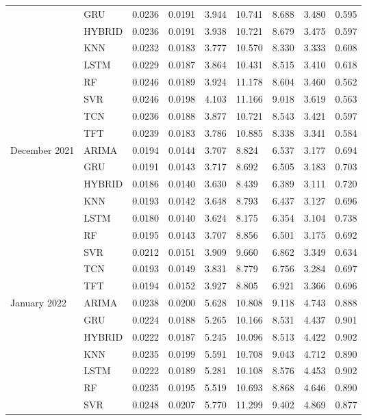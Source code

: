 \begin{tabular}{lllllllll}
 & GRU & 0.0236 & 0.0191 & 3.944 & 10.741 & 8.688 & 3.480 & 0.595 \\
 & HYBRID & 0.0236 & 0.0191 & 3.938 & 10.721 & 8.679 & 3.475 & 0.597 \\
 & KNN & 0.0232 & 0.0183 & 3.777 & 10.570 & 8.330 & 3.333 & 0.608 \\
 & LSTM & 0.0229 & 0.0187 & 3.864 & 10.431 & 8.515 & 3.410 & 0.618 \\
 & RF & 0.0246 & 0.0189 & 3.924 & 11.178 & 8.604 & 3.460 & 0.562 \\
 & SVR & 0.0246 & 0.0198 & 4.103 & 11.166 & 9.018 & 3.619 & 0.563 \\
 & TCN & 0.0236 & 0.0188 & 3.877 & 10.721 & 8.543 & 3.421 & 0.597 \\
 & TFT & 0.0239 & 0.0183 & 3.786 & 10.885 & 8.338 & 3.341 & 0.584 \\
December 2021 & ARIMA & 0.0194 & 0.0144 & 3.707 & 8.824 & 6.537 & 3.177 & 0.694 \\
 & GRU & 0.0191 & 0.0143 & 3.717 & 8.692 & 6.505 & 3.183 & 0.703 \\
 & HYBRID & 0.0186 & 0.0140 & 3.630 & 8.439 & 6.389 & 3.111 & 0.720 \\
 & KNN & 0.0193 & 0.0142 & 3.648 & 8.793 & 6.437 & 3.127 & 0.696 \\
 & LSTM & 0.0180 & 0.0140 & 3.624 & 8.175 & 6.354 & 3.104 & 0.738 \\
 & RF & 0.0195 & 0.0143 & 3.707 & 8.856 & 6.501 & 3.175 & 0.692 \\
 & SVR & 0.0212 & 0.0151 & 3.909 & 9.660 & 6.862 & 3.349 & 0.634 \\
 & TCN & 0.0193 & 0.0149 & 3.831 & 8.779 & 6.756 & 3.284 & 0.697 \\
 & TFT & 0.0194 & 0.0152 & 3.927 & 8.805 & 6.921 & 3.366 & 0.696 \\
January 2022 & ARIMA & 0.0238 & 0.0200 & 5.628 & 10.808 & 9.118 & 4.743 & 0.888 \\
 & GRU & 0.0224 & 0.0188 & 5.265 & 10.166 & 8.531 & 4.437 & 0.901 \\
 & HYBRID & 0.0222 & 0.0187 & 5.245 & 10.096 & 8.513 & 4.422 & 0.902 \\
 & KNN & 0.0235 & 0.0199 & 5.591 & 10.708 & 9.043 & 4.712 & 0.890 \\
 & LSTM & 0.0222 & 0.0189 & 5.281 & 10.108 & 8.576 & 4.453 & 0.902 \\
 & RF & 0.0235 & 0.0195 & 5.519 & 10.693 & 8.868 & 4.646 & 0.890 \\
 & SVR & 0.0248 & 0.0207 & 5.770 & 11.299 & 9.402 & 4.869 & 0.877 \\

\end{tabular}
